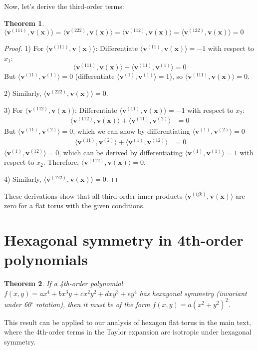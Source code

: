 \documentclass{article}
\def\vv{{\bm{v}}}
\def\vx{{\bm{x}}}
\def\evx{{x}}
\newtheorem{theorem}{Theorem}
\begin{document}
Now, let's derive the third-order terms:

\begin{theorem}
$\langle \vv^{(111)}, \vv(\vx) \rangle = \langle \vv^{(222)}, \vv(\vx) \rangle = \langle \vv^{(112)}, \vv(\vx) \rangle = \langle \vv^{(122)}, \vv(\vx) \rangle = 0$
\end{theorem}

\begin{proof}
1) For $\langle \vv^{(111)}, \vv(\vx) \rangle$:
   Differentiate $\langle \vv^{(11)}, \vv(\vx) \rangle = -1$ with respect to $\evx_1$:
   \[
   \langle \vv^{(111)}, \vv(\vx) \rangle + \langle \vv^{(11)}, \vv^{(1)} \rangle = 0
   \]
   But $\langle \vv^{(11)}, \vv^{(1)} \rangle = 0$ (differentiate $\langle \vv^{(1)}, \vv^{(1)} \rangle = 1$), so $\langle \vv^{(111)}, \vv(\vx) \rangle = 0$.

2) Similarly, $\langle \vv^{(222)}, \vv(\vx) \rangle = 0$.

3) For $\langle \vv^{(112)}, \vv(\vx) \rangle$:
   Differentiate $\langle \vv^{(11)}, \vv(\vx) \rangle = -1$ with respect to $\evx_2$:
   \begin{align*}
   \langle \vv^{(112)}, \vv(\vx) \rangle + \langle \vv^{(11)}, \vv^{(2)} \rangle &= 0
   \end{align*}
   But $\langle \vv^{(11)}, \vv^{(2)} \rangle = 0$, which we can show by differentiating $\langle \vv^{(1)}, \vv^{(2)} \rangle = 0$
   \begin{align*}\
   \langle \vv^{(11)}, \vv^{(2)} \rangle + \langle \vv^{(1)}, \vv^{(12)} \rangle &= 0 
   \end{align*}
   $ \langle \vv^{(1)}, \vv^{(12)} \rangle = 0$, which can be derived by differentiating $ \langle \vv^{(1)}, \vv^{(1)} \rangle = 1$ with respect to $\evx_2$.
   Therefore, $\langle \vv^{(112)}, \vv(\vx) \rangle = 0$.
   
4) Similarly, $\langle \vv^{(122)}, \vv(\vx) \rangle = 0$.
\end{proof}

These derivations show that all third-order inner products $\langle \vv^{(ijk)}, \vv(\vx) \rangle$ are zero for a flat torus with the given conditions.



\section{Hexagonal symmetry in 4th-order polynomials}
\label{sec:poly}

\begin{theorem}
If a 4th-order polynomial $f(x, y) = ax^4 + bx^3y + cx^2y^2 + dxy^3 + ey^4$ has hexagonal symmetry (invariant under 60$^\circ$ rotation), then it must be of the form $f(x, y) = a(x^2 + y^2)^2$.
\end{theorem}
This result can be applied to our analysis of hexagon flat torus in the main text, where the 4th-order terms in the Taylor expansion are isotropic under hexagonal symmetry. 
\end{document}
